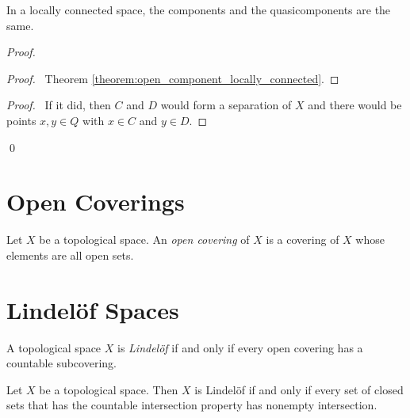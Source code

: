 \begin{proposition}
    In a locally connected space, the components and the quasicomponents are the same.
\end{proposition}

\begin{proof}
    \pf
    \begin{proof}
        \pf\ Theorem \ref{theorem:open_component_locally_connected}.
    \end{proof}
    \begin{proof}
        \pf\ If it did, then $C$ and $D$ would form a separation of $X$
        and there would be points $x, y \in Q$ with $x \in C$ and $y \in D$.
    \end{proof}
    \qed
\end{proof}

\section{Open Coverings}

\begin{definition}
    Let $X$ be a topological space. An \emph{open covering} of $X$ is a covering
    of $X$ whose elements are all open sets.
\end{definition}

\section{Lindel\"{o}f Spaces}

\begin{definition}
    A topological space $X$ is \emph{Lindel\"{o}f} if and only if every open covering
    has a countable subcovering.
\end{definition}

\begin{proposition}
    Let $X$ be a topological space. Then $X$ is Lindel\"{o}f if and only if 
    every set of closed sets that has the countable intersection property has
    nonempty intersection.
\end{proposition}

